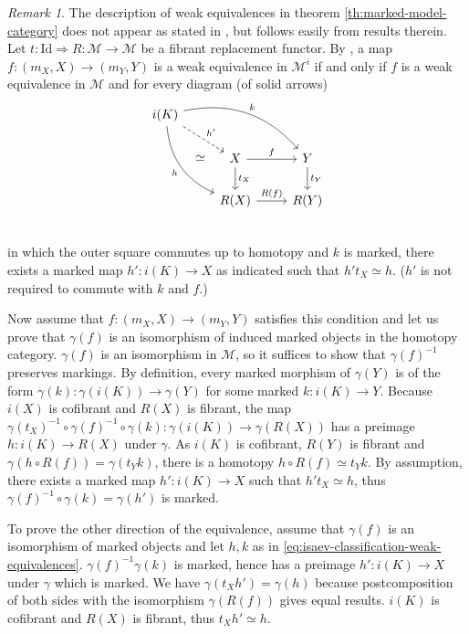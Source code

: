 \documentclass[a4paper]{article}
\theoremstyle{remark}
\newtheorem{remark}[theorem]{Remark}
\theoremstyle{definition}
\begin{document}
\begin{remark}
  The description of weak equivalences in theorem \ref{th:marked-model-category} does not appear as stated in \citet{marked-objects}, but follows easily from results therein.
  Let $t : \mathrm{Id} \Rightarrow R : \mathcal{M} \rightarrow \mathcal{M}$ be a fibrant replacement functor.
  By \citet[lemma 2.5]{marked-objects}, a map $f : (m_X, X) \rightarrow (m_Y, Y)$ is a weak equivalence in $\mathcal{M}^i$ if and only if $f$ is a weak equivalence in $\mathcal{M}$ and for every diagram (of solid arrows)
  \begin{equation}
    \label{eq:isaev-classification-weak-equivalences}
    \begin{tikzcd}
      i(K) \arrow[drr, bend left, "k"] \arrow[ddr, bend right, "h"'] \arrow[dr, dashed, "h'"] \arrow[ddr, phantom, "\simeq"] \\
      & X \arrow[d, "t_X"] \arrow[r, "f"] & Y \arrow[d, "t_Y"]  \\
      & R(X) \arrow[r, "R(f)"] & R(Y)  \\
    \end{tikzcd}
  \end{equation}
  in which the outer square commutes up to homotopy and $k$ is marked, there exists a marked map $h' : i(K) \rightarrow X$ as indicated such that $h' t_X \simeq h$.
  ($h'$ is not required to commute with $k$ and $f$.)

  Now assume that $f : (m_X, X) \rightarrow (m_Y, Y)$ satisfies this condition and let us prove that $\gamma(f)$ is an isomorphism of induced marked objects in the homotopy category.
  $\gamma(f)$ is an isomorphism in $\mathcal{M}$, so it suffices to show that $\gamma(f)^{-1}$ preserves markings.
  By definition, every marked morphism of $\gamma(Y)$ is of the form $\gamma(k) : \gamma(i(K)) \rightarrow \gamma(Y)$ for some marked $k : i(K) \rightarrow Y$.
  Because $i(X)$ is cofibrant and $R(X)$ is fibrant, the map $\gamma(t_X)^{-1} \circ \gamma(f)^{-1} \circ \gamma(k) : \gamma(i(K)) \rightarrow \gamma(R(X))$ has a preimage $h : i(K) \rightarrow R(X)$ under $\gamma$.
  As $i(K)$ is cofibrant, $R(Y)$ is fibrant and $\gamma(h \circ R(f)) = \gamma(t_Y k)$, there is a homotopy $h \circ R(f) \simeq t_Y k$.
  By assumption, there exists a marked map $h' : i(K) \rightarrow X$ such that $h' t_X \simeq h$, thus $\gamma(f)^{-1} \circ \gamma(k) = \gamma(h')$ is marked.

  To prove the other direction of the equivalence, assume that $\gamma(f)$ is an isomorphism of marked objects and let $h, k$ as in \eqref{eq:isaev-classification-weak-equivalences}.
  $\gamma(f)^{-1} \gamma(k)$ is marked, hence has a preimage $h' : i(K) \rightarrow X$ under $\gamma$ which is marked.
  We have $\gamma(t_X h') = \gamma(h)$ because postcomposition of both sides with the isomorphism $\gamma(R(f))$ gives equal results.
  $i(K)$ is cofibrant and $R(X)$ is fibrant, thus $t_X h' \simeq h$.
\end{remark}
\end{document}
